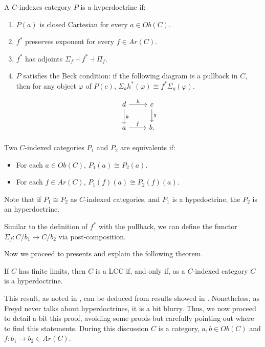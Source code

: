 \begin{definition}
  A $C$-indexes category $P$ is a hyperdoctrine if:
  \begin{enumerate}
  \item $P(a)$ is closed Cartesian for every $a\in Ob(C)$.
  \item $f^*$ preserves exponent for every $f\in Ar(C)$.
  \item $f^*$ has adjoints $\Sigma_f \dashv f^* \dashv \Pi_f$.
  \item $P$ satisfies the Beck condition: if the following diagram is a pullback in $C$, then for any object $\varphi$ of $P(c)$, $\Sigma_k h^*(\varphi) \cong f^*\Sigma_g(\varphi)$.
    \[
      \begin{tikzpicture}
        \node {\begin{tikzcd}
            d\ar[r,"h"]\ar[d,"k"] & c\ar[d,"g"]\\
            a\ar[r,"f"] &   b.
          \end{tikzcd}};
      \end{tikzpicture}
    \]
    
  \end{enumerate}
\end{definition}
\begin{definition}
  Two $C$-indexed categories $P_1$ and $P_2$ are equivalents if:
  \begin{itemize}
  \item For each $a\in Ob(C)$, $P_1(a)\cong P_2(a)$.
  \item For each $f\in Ar(C)$, $P_1(f)(a)\cong P_2(f)(a)$.
  \end{itemize}
\end{definition}

Note that if $P_1\cong P_2$ as $C$-indexed categories, and $P_1$ is a hypedoctrine, the $P_2$ is an hyperdoctrine.

\begin{remark}
  Similar to the definition of $f^*$ with the pullback, we can define the functor $\Sigma_f: C/b_1 \to C/b_2$ via post-composition. 
\end{remark}


Now we proceed to presents and explain the following theorem.

\begin{theorem}
  If $C$ has finite limits, then $C$ is a LCC if, and only if, as a $C$-indexed category $C$ is a hyperdoctrine. 
\end{theorem}

This result, as noted in \cites{seely1984locally}, can be deduced from results showed in \cite[Section 1.3]{freyd1972aspects}. Nonetheless, as Freyd never talks about hyperdoctrines, it is a bit blurry. Thus, we now proceed to detail a bit this proof, avoiding some proofs but carefully pointing out where to find this statements. During this discussion $C$ is a category, $a,b\in Ob(C)$ and $f:b_1\to b_2\in Ar(C)$.\\


